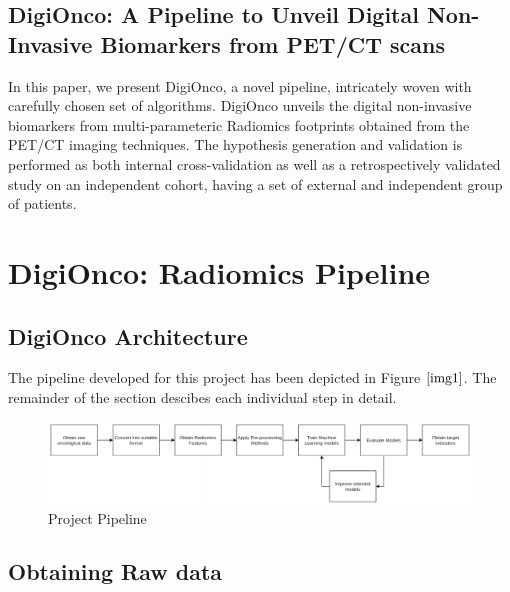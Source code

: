 \documentclass[10pt,journal,compsoc]{IEEEtran}
\begin{document}
\subsection{DigiOnco: A Pipeline to Unveil Digital Non-Invasive Biomarkers from PET/CT scans}

In this paper, we present DigiOnco, a novel pipeline, intricately woven with carefully chosen set of algorithms. DigiOnco unveils the digital non-invasive biomarkers from multi-parameteric Radiomics footprints obtained from the PET/CT imaging techniques. The hypothesis generation and validation is performed as both internal cross-validation as well as a retrospectively validated study on an independent cohort, having a set of external and independent group of patients.

\section{DigiOnco: Radiomics Pipeline}
\subsection{DigiOnco Architecture}


The pipeline developed for this project has been depicted in Figure $\ref{img1}$. The remainder of the section descibes each individual step in detail.

\begin{figure}[!b]
\centering
\includegraphics[width=6in]{img1.png}
\caption{Project Pipeline}
\label{img1}
\end{figure}

\subsection{Obtaining Raw data}
\end{document}

